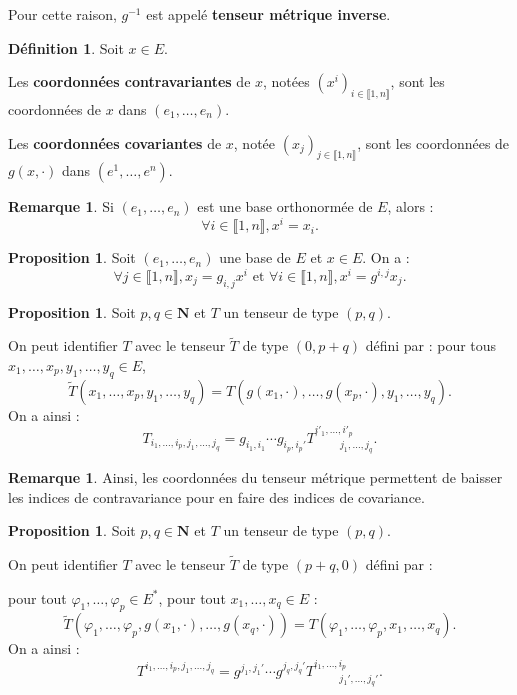\documentclass[12pt,a4paper]{article}
\theoremstyle{definition}
\newtheorem{prop}[thm]{Proposition}
\newtheorem{defn}[thm]{Définition}
\newtheorem{rqe}[thm]{Remarque}
\begin{document}
Pour cette raison, $g^{-1}$ est appelé \textbf{tenseur métrique inverse}.
\begin{defn}
Soit $x\in E$.

Les \textbf{coordonnées contravariantes} de $x$, notées $\left(x^i\right)_{i\in\llbracket 1,n\rrbracket}$, sont les coordonnées de $x$ dans $(e_1,\ldots,e_n)$.

Les \textbf{coordonnées covariantes} de $x$, notée $(x_j)_{j\in\llbracket 1,n\rrbracket}$, sont les coordonnées de $g(x,\cdot)$ dans $\left(e^1,\ldots,e^n\right)$.
\end{defn}
\begin{rqe}
Si $(e_1,\ldots,e_n)$ est une base orthonormée de $E$, alors :$$\forall i\in\llbracket 1,n\rrbracket, x^i=x_i.$$
\end{rqe}
\begin{prop}
Soit $(e_1,\ldots,e_n)$ une base de $E$ et $x\in E$. On a :
$$
\forall j\in\llbracket 1,n\rrbracket, x_j=g_{i,j}x^i\text{ et }\forall i\in\llbracket 1,n\rrbracket, x^i=g^{i,j}x_j.
$$
\end{prop}
\begin{prop}
Soit $p,q\in\mathbf{N}$ et $T$ un tenseur de type $(p,q)$.

On peut identifier $T$ avec le tenseur $\widetilde{T}$ de type $(0,p+q)$ défini par : pour tous $x_1,\ldots,x_p,y_1,\ldots,y_q\in E$, $$
\widetilde{T}(x_1,\ldots,x_p,y_1,\ldots,y_q)=T\left(g(x_1,\cdot),\ldots,g(x_p,\cdot),y_1,\ldots,y_q\right).
$$
On a ainsi :
$$
T_{i_1,\ldots,i_p,j_1,\ldots,j_q}=g_{i_1,i_1}\cdots g_{i_p,i_p'}T^{i'_1,\ldots,i'_p}_{\;\;\qquad j_1,\ldots,j_q}.
$$
\end{prop}
\begin{rqe}
Ainsi, les coordonnées du tenseur métrique permettent de \og baisser \fg{} les indices de contravariance pour en faire des indices de covariance. 
\end{rqe}
\begin{prop}
Soit $p,q\in\mathbf{N}$ et $T$ un tenseur de type $(p,q)$.

On peut identifier $T$ avec le tenseur $\widetilde{T}$ de type $(p+q,0)$ défini par :

pour tout $\varphi_1,\ldots,\varphi_p\in E^*$, pour tout $x_1,\ldots,x_q\in E$ :
$$\widetilde{T}(\varphi_1,\ldots,\varphi_p,g(x_1,\cdot),\ldots,g(x_q,\cdot))=T\left(\varphi_1,\ldots,\varphi_p,x_1,\ldots,x_q\right).
$$
On a ainsi :
$$
T^{i_1,\ldots,i_p,j_1,\ldots,j_q}=g^{j_1,j_1'}\cdots g^{j_q,j_q'}T_{\;\;\qquad j_1',\ldots,j_q'}^{i_1,\ldots,i_p}.
$$
\end{prop}
\end{document}
